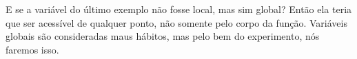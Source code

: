 E se a variável  do último exemplo não fosse local, mas sim global?
Então ela teria que ser acessível de qualquer ponto, não somente pelo corpo da função.
Variáveis globais são consideradas maus hábitos, mas pelo bem do experimento, nós faremos isso.


\fi


\EN{}
\RU{}
\PTBR{}
\EN{}
\RU{}

